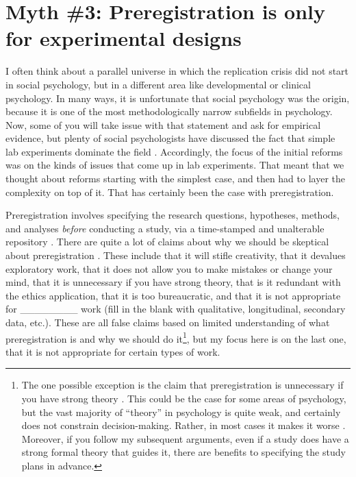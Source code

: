 \documentclass[authordate, empirical]{jote-new-article}
\begin{document}
\section{Myth \#3: Preregistration is only for experimental designs}







I often think about a parallel universe in which the replication crisis did not start in social psychology, but in a different area like developmental or clinical psychology. In many ways, it is unfortunate that social psychology was the origin, because it is one of the most methodologically narrow subfields in psychology. Now, some of you will take issue with that statement and ask for empirical evidence, but plenty of social psychologists have discussed the fact that simple lab experiments dominate the field \parencites{Baumeister2007}{Cialdini2009}{Rozin2001}. Accordingly, the focus of the initial reforms was on the kinds of issues that come up in lab experiments. That meant that we thought about reforms starting with the simplest case, and then had to layer the complexity on top of it. That has certainly been the case with preregistration.







Preregistration involves specifying the research questions, hypotheses, methods, and analyses \emph{before} conducting a study, via a time-stamped and unalterable repository \parencites{Nosek2018}. There are quite a lot of claims about why we should be skeptical about preregistration \parencites{MacEachern2019}{McDermott2022}{Pham2021}{Szollosi2020}. These include that it will stifle creativity, that it devalues exploratory work, that it does not allow you to make mistakes or change your mind, that it is unnecessary if you have strong theory, that is it redundant with the ethics application, that it is too bureaucratic, and that it is not appropriate for \_\_\_\_\_\_\_\_ work (fill in the blank with qualitative, longitudinal, secondary data, etc.). These are all false claims based on limited understanding of what preregistration is and why we should do it\footnote{ The one possible exception is the claim that preregistration is unnecessary if you have strong theory \parencite{Szollosi2020}. This could be the case for some areas of psychology, but the vast majority of “theory” in psychology is quite weak, and certainly does not constrain decision-making. Rather, in most cases it makes it worse \parencites{LeBel2011}. Moreover, if you follow my subsequent arguments, even if a study does have a strong formal theory that guides it, there are benefits to specifying the study plans in advance. }, but my focus here is on the last one, that it is not appropriate for certain types of work.
\end{document}
